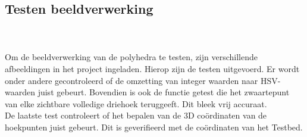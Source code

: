\subsection{Testen beeldverwerking}
\\\\
Om de beeldverwerking van de polyhedra te testen, zijn verschillende afbeeldingen in het project ingeladen. Hierop zijn de testen uitgevoerd. Er wordt onder andere gecontroleerd of de omzetting van integer waarden naar HSV-waarden juist gebeurt. Bovendien is ook de functie getest die het zwaartepunt van elke zichtbare volledige driehoek teruggeeft. Dit bleek vrij accuraat.
\\
De laatste test controleert of het bepalen van de 3D co\"ordinaten van de hoekpunten juist gebeurt. Dit is geverifieerd met de co\"ordinaten van het Testbed.
